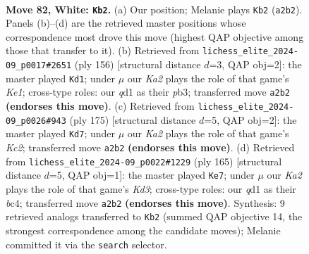 \documentclass[11pt]{article}
\begin{document}
\clearpage

\begin{figure}[p]\centering
\begin{subfigure}{0.46\textwidth}\centering
\resizebox{\linewidth}{!}{%
\newchessgame
\chessboard[
  setfen={8/8/1p6/p4k2/2P5/8/K7/3q4 w - - 20 82},
  showmover=false,
  pgfstyle=straightmove, color=movearrow, markmove={a2-b2}
]}
\caption{}
\end{subfigure}\hfill
\begin{subfigure}{0.46\textwidth}\centering
\resizebox{\linewidth}{!}{%
\newchessgame
\chessboard[
  setfen={8/8/8/3k2p1/5pP1/1p6/8/4K3 w - - 0 79},
  showmover=false,
  pgfstyle=straightmove, color=movearrow, markmove={e1-d1}
]}
\caption{}
\end{subfigure}
\\[4pt]
\begin{subfigure}{0.46\textwidth}\centering
\resizebox{\linewidth}{!}{%
\newchessgame
\chessboard[
  setfen={8/2k5/p7/P2K4/1P6/8/8/8 b - - 14 88},
  showmover=false,
  pgfstyle=straightmove, color=movearrow, markmove={c7-d7}
]}
\caption{}
\end{subfigure}\hfill
\begin{subfigure}{0.46\textwidth}\centering
\resizebox{\linewidth}{!}{%
\newchessgame
\chessboard[
  setfen={8/8/3k2K1/p7/P1B4P/6P1/8/8 b - - 0 83},
  showmover=false,
  pgfstyle=straightmove, color=movearrow, markmove={d6-e7}
]}
\caption{}
\end{subfigure}
\caption{\textbf{Move 82, White: \texttt{Kb2}.} (a) Our position; Melanie plays \texttt{Kb2} (\texttt{a2b2}). Panels (b)--(d) are the retrieved master positions whose correspondence most drove this move (highest QAP objective among those that transfer to it). (b) Retrieved from \texttt{lichess\_elite\_2024-09\_p0017\#2651} (ply 156) [structural distance $d$=3, QAP obj=2]: the master played \texttt{Kd1}; under $\mu$ our \emph{Ka2} plays the role of that game's \emph{Ke1}; cross-type roles: our \emph{q}d1 as their \emph{p}b3; transferred move \texttt{a2b2} \textbf{(endorses this move)}. (c) Retrieved from \texttt{lichess\_elite\_2024-09\_p0026\#943} (ply 175) [structural distance $d$=5, QAP obj=2]: the master played \texttt{Kd7}; under $\mu$ our \emph{Ka2} plays the role of that game's \emph{Kc2}; transferred move \texttt{a2b2} \textbf{(endorses this move)}. (d) Retrieved from \texttt{lichess\_elite\_2024-09\_p0022\#1229} (ply 165) [structural distance $d$=5, QAP obj=1]: the master played \texttt{Ke7}; under $\mu$ our \emph{Ka2} plays the role of that game's \emph{Kd3}; cross-type roles: our \emph{q}d1 as their \emph{b}c4; transferred move \texttt{a2b2} \textbf{(endorses this move)}. Synthesis: 9 retrieved analogs transferred to \texttt{Kb2} (summed QAP objective 14, the strongest correspondence among the candidate moves); Melanie committed it via the \texttt{search} selector.}
\label{fig:thought-m162}
\end{figure}
\end{document}
